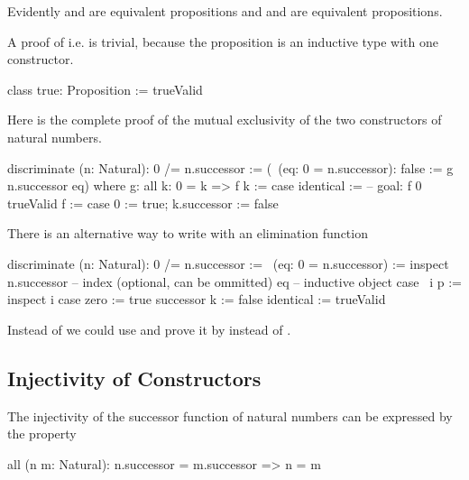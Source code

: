 Evidently  and  are equivalent propositions and  and  are equivalent propositions.

A proof of  i.e.  is trivial, because the proposition
 is an inductive type with one constructor.

\begin{alba}
    class true: Proposition := trueValid
\end{alba}


Here is the complete proof of the mutual exclusivity of the two constructors of
natural numbers.


\begin{alba}
    discriminate (n: Natural): 0 /= n.successor
    :=
        (\ (eq: 0 = n.successor): false := g n.successor eq)
        where
            g: all k: 0 = k => f k :=
                case
                    identical :=
                        -- goal: f 0
                        trueValid
            f :=
                case 0 := true; k.successor := false
\end{alba}


There is an alternative way to write  with an elimination
function

\begin{alba}
    discriminate (n: Natural): 0 /= n.successor :=
        \ (eq: 0 = n.successor) :=
            inspect
                n.successor     -- index (optional, can be ommitted)
                eq              -- inductive object
            case
                {\ i p :=
                    inspect i case
                        zero := true
                        successor k := false}
                identical := trueValid
\end{alba}

Instead of  we could use  and
prove it by  instead of .




\subsection{Injectivity of Constructors}

The injectivity of the successor function of natural numbers can be expressed
by the property

\begin{alba}
    all (n m: Natural): n.successor = m.successor  =>  n = m
\end{alba}

